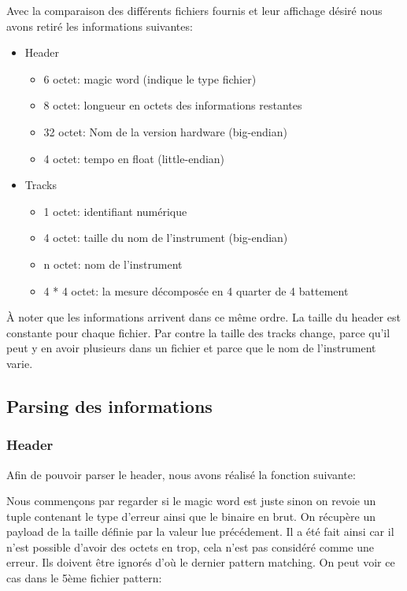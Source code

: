 \documentclass[10pt,a4paper]{article}
\begin{document}
Avec la comparaison des différents fichiers fournis et leur affichage désiré nous avons retiré les informations suivantes:
\begin{itemize}
    \item Header
    \begin{itemize}
		\item 6 octet: magic word (indique le type fichier)
		\item 8 octet: longueur en octets des informations restantes
		\item 32 octet: Nom de la version hardware (big-endian)
		\item 4 octet: tempo en float (little-endian)  
    \end{itemize}
    
    \item Tracks	
    \begin{itemize}
    	\item 1 octet: identifiant numérique
    	\item 4 octet: taille du nom de l'instrument (big-endian)
    	\item n octet: nom de l'instrument 
    	\item 4 * 4 octet: la mesure décomposée en 4 quarter de 4 battement
    \end{itemize}
\end{itemize}

À noter que les informations arrivent dans ce même ordre. La taille du header est constante pour chaque fichier. Par contre la taille des tracks change, parce qu'il peut y en avoir plusieurs dans un fichier et parce que le nom de l'instrument varie.

\newpage

\subsection{Parsing des informations}

\subsubsection{Header}
Afin de pouvoir parser le header, nous avons réalisé la fonction suivante:



Nous commençons par regarder si le magic word est juste sinon on revoie un tuple contenant le type d'erreur ainsi que le binaire en brut. On récupère un payload de la taille définie par la valeur lue précédement. Il a été fait ainsi car il n'est possible d'avoir des octets en trop, cela n'est pas considéré comme une erreur. Ils doivent être ignorés d'où le dernier pattern matching. On peut voir ce cas dans le 5ème fichier pattern:
\end{document}
